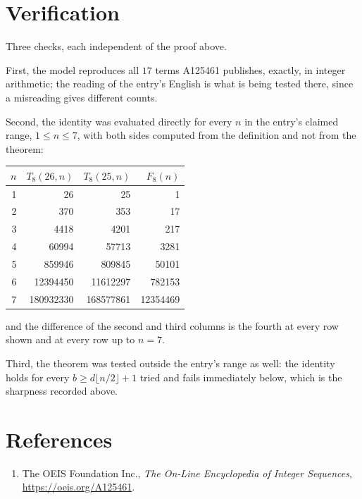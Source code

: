 \documentclass[11pt,a4paper]{article}
\theoremstyle{plain}
\theoremstyle{definition}
\begin{document}
\section{Verification}

Three checks, each independent of the proof above.

First, the model reproduces all $17$ terms A125461 publishes, exactly, in integer
arithmetic; the reading of the entry's English is what is being tested there, since a
misreading gives different counts.

Second, the identity was evaluated directly for every $n$ in the entry's claimed range,
$1\le n\le7$, with both sides computed from the definition and not from the theorem:

\begin{center}
\begin{tabular}{rrrr}
$n$ & $T_{8}(26,n)$ & $T_{8}(25,n)$ & $F_{8}(n)$ \\ \hline
1 & 26 & 25 & 1 \\
2 & 370 & 353 & 17 \\
3 & 4418 & 4201 & 217 \\
4 & 60994 & 57713 & 3281 \\
5 & 859946 & 809845 & 50101 \\
6 & 12394450 & 11612297 & 782153 \\
7 & 180932330 & 168577861 & 12354469 \\
\end{tabular}
\end{center}

\noindent and the difference of the second and third columns is the fourth at every row shown
and at every row up to $n=7$.

Third, the theorem was tested outside the entry's range as well: the identity holds for every
$b\ge d\lfloor n/2\rfloor+1$ tried and fails immediately below, which is the sharpness recorded
above.

\section*{References}
\begin{enumerate}
\item The OEIS Foundation Inc., \emph{The On-Line Encyclopedia of Integer Sequences},
\url{https://oeis.org/A125461}.
\end{enumerate}
\end{document}
